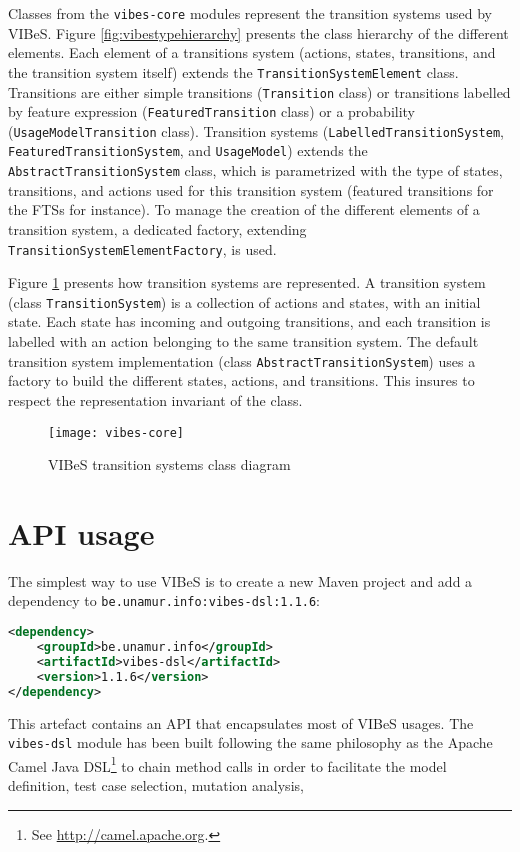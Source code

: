 Classes from the \texttt{vibes-core} modules represent the transition systems used by \gls{VIBeS}. Figure \ref{fig:vibestypehierarchy} presents the class hierarchy of the different elements. Each element of a transitions system (actions, states, transitions, and the transition system itself) extends the \texttt{Tran\-si\-tion\-Sys\-tem\-Ele\-ment} class. Transitions are either simple transitions (\texttt{Transition} class) or transitions labelled by feature expression (\texttt{FeaturedTransition} class) or a probability (\texttt{UsageModelTransition} class). Transition systems (\texttt{Label\-led\-Tran\-sition\-System}, \texttt{Fea\-tu\-red\-Tran\-sit\-ion\-System}, and \texttt{Usage\-Mo\-del}) extends the \texttt{Ab\-stract\-Tran\-si\-tion\-System} class,  which is parametrized with the type of states, transitions, and actions used for this transition system (featured transitions for the \glspl{FTS} for instance). To manage the creation of the different elements of a transition system, a dedicated factory, extending \texttt{Tran\-si\-tion\-Sys\-tem\-Ele\-ment\-Facto\-ry}, is used.

Figure \ref{fig:vibescore} presents how transition systems are represented. A transition system (class \texttt{TransitionSystem}) is a collection of actions and states, with an initial state. Each state has incoming and outgoing transitions, and each transition is labelled with an action belonging to the same transition system. The default transition system implementation (class \texttt{AbstractTransitionSystem}) uses a factory to build the different states, actions, and transitions. This insures to respect the representation invariant of the class.

\begin{figure}
	\centering
	\texttt{[image: vibes-core]}
	\caption{\gls{VIBeS} transition systems class diagram}
	\label{fig:vibescore}
\end{figure}


\section{API usage}

\label{sec:vibesusages}

The simplest way to use \gls{VIBeS} is to create a new Maven project and add a dependency to  \texttt{be.unamur.info:vibes-dsl:1.1.6}:
%
\begin{lstlisting}[language=XML,frame=single,numbers=none,morekeywords={dependency,groupId,artifactId,version}]
<dependency>
    <groupId>be.unamur.info</groupId>
    <artifactId>vibes-dsl</artifactId>
    <version>1.1.6</version>
</dependency>
\end{lstlisting}
This artefact contains an \gls{API} that encapsulates most of \gls{VIBeS} usages. The \texttt{vibes-dsl} module has been built following the same philosophy as the Apache Camel Java DSL\footnote{See \url{http://camel.apache.org}.} to chain method calls in order to facilitate the model definition, test case selection, mutation analysis, \etc

